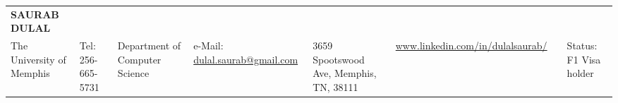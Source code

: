 \documentclass{resume} %
\begin{document}

\begin{multicols}{2}
    \noindent
        \begin{tabular}{ p{8cm} p{9.1cm}}
        
        \textbf{SAURAB DULAL} \\
        The University of Memphis & \raggedleft Tel: 256-665-5731
        & Department of Computer Science & \raggedleft e-Mail: \href{mailto: dulal.saurab@gmail.com}{dulal.saurab@gmail.com}
        & 3659 Spootswood Ave, Memphis, TN, 38111 & \raggedleft  \href{www.linkedin.com/in/dulalsaurab/}{www.linkedin.com/in/dulalsaurab/} & & \raggedleft Status: F1 Visa holder
    
        \end{tabular}
    \end{multicols}
    


\end{document}
